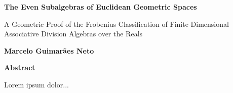 \thispagestyle{plain}
\begin{center}
    \Large
    \textbf{The Even Subalgebras of Euclidean Geometric Spaces}
        
    \vspace{0.4cm}
    \large
    A Geometric Proof of the Frobenius Classification of Finite-Dimensional Associative Division Algebras over the Reals       

    \vspace{0.4cm}
    \textbf{Marcelo Guimarães Neto}
       
    \vspace{0.9cm}
    \textbf{Abstract}
\end{center}
Lorem ipsum dolor...
